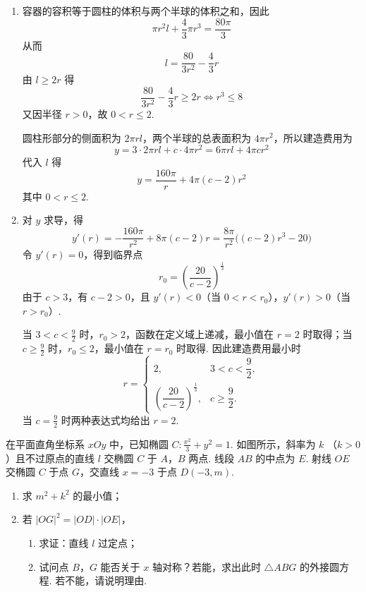 \begin{solution}
\begin{enumerate}
\item 容器的容积等于圆柱的体积与两个半球的体积之和，因此
\[
\pi r^{2}l+\frac43\pi r^{3}=\frac{80\pi}{3}
\]
从而
\[
l=\frac{80}{3r^{2}}-\frac43r
\]
由 \(l\geqslant2r\) 得
\[
\frac{80}{3r^{2}}-\frac43r\geqslant2r\iff r^{3}\leqslant8
\]
又因半径 \(r>0\)，故 \(0<r\leqslant2\).

圆柱形部分的侧面积为 \(2\pi rl\)，两个半球的总表面积为 \(4\pi r^{2}\)，所以建造费用为
\[
y=3\cdot2\pi rl+c\cdot4\pi r^{2}=6\pi rl+4\pi cr^{2}
\]
代入 \(l\) 得
\[
y=\frac{160\pi}{r}+4\pi(c-2)r^{2}
\]
其中 \(0<r\leqslant2\).

\item 对 \(y\) 求导，得
\[
y'(r)=-\frac{160\pi}{r^{2}}+8\pi(c-2)r=\frac{8\pi}{r^{2}}\bigl((c-2)r^{3}-20\bigr)
\]
令 \(y'(r)=0\)，得到临界点
\[
r_0=\left(\frac{20}{c-2}\right)^{\frac{1}{3}}
\]
由于 \(c>3\)，有 \(c-2>0\)，且 \(y'(r)<0\)（当 \(0<r<r_0\)），\(y'(r)>0\)（当 \(r>r_0\)）.

当 \(3<c<\frac92\) 时，\(r_0>2\)，函数在定义域上递减，最小值在 \(r=2\) 时取得；当 \(c\geqslant\frac92\) 时，\(r_0\leqslant2\)，最小值在 \(r=r_0\) 时取得. 因此建造费用最小时
\[
r=\begin{cases}
2,&3<c<\dfrac92,\\
\left(\dfrac{20}{c-2}\right)^{\frac{1}{3}},&c\geqslant\dfrac92.
\end{cases}
\]
当 \(c=\frac92\) 时两种表达式均给出 \(r=2\).
\end{enumerate}
\end{solution}

\begin{problem}
在平面直角坐标系 \(xOy\) 中，已知椭圆 \(C: \frac{x^2}{3} + y^2 = 1\). 如图所示，斜率为 \(k \) （\(k > 0\)）且不过原点的直线 \(l\) 交椭圆 \(C\) 于 \(A\)，\(B\) 两点. 线段 \(AB\) 的中点为 \(E\). 射线 \(OE\) 交椭圆 \(C\) 于点 \(G\)，交直线 \(x = -3\) 于点 \(D(-3, m)\).
\begin{enumerate}
\item 求 \(m^{2} + k^{2}\) 的最小值；
\item 若 \(\left|OG\right|^{2}=\left|OD\right|\cdot\left|OE\right|\)，
\begin{enumerate}
\item 求证：直线 \(l\) 过定点；
\item 试问点 \(B\)，\(G\) 能否关于 \(x\) 轴对称？若能，求出此时 \(\triangle ABG\) 的外接圆方程. 若不能，请说明理由.
\end{enumerate}
\end{enumerate}

\end{problem}

